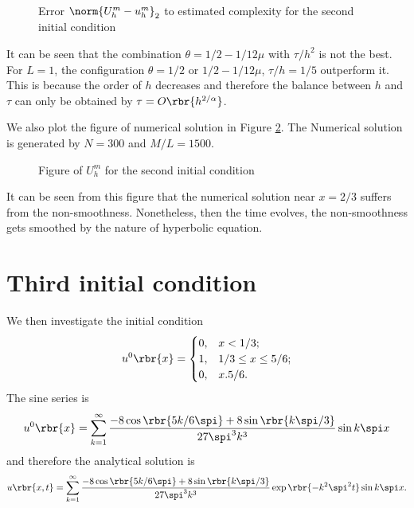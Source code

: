 \documentclass[english, nochinese]{pnote}
\begin{document}
\begin{figure}
\centering
\scalebox{0.75}{}
\caption{Error $ \norm{ U_h^m - u_h^m }_2 $ to estimated complexity for the second initial condition}
\label{Fig:Eff22}
\end{figure}

It can be seen that the combination $ \theta = 1 / 2 - 1 / 12 \mu $  with $ \tau / h^2 $ is not the best. For $ L = 1 $, the configuration $ \theta = 1 / 2 $ or $ 1 / 2 - 1 / 12 \mu $, $ \tau / h = 1 / 5$ outperform it. This is because the order of $h$ decreases and therefore the balance between $h$ and $\tau$ can only be obtained by $ \tau = O \rbr{h^{ 2 / \alpha }} $.

We also plot the figure of numerical solution in Figure \ref{Fig:NumSol2}. The Numerical solution is generated by $ N = 300 $ and $ M / L = 1500 $.

\begin{figure}
\centering

\caption{Figure of $U_h^m$ for the second initial condition}
\label{Fig:NumSol2}
\end{figure}

It can be seen from this figure that the numerical solution near $ x = 2 / 3 $ suffers from the non-smoothness. Nonetheless, then the time evolves, the non-smoothness gets smoothed by the nature of hyperbolic equation.

\section{Third initial condition}

We then investigate the initial condition
\begin{equation}
u^0 \rbr{x} =
\begin{cases}
0, & x < 1 / 3; \\
1, & 1 / 3 \le x \le 5 / 6; \\
0, & x . 5 / 6.
\end{cases}
\end{equation}
The sine series is
\begin{equation}
u^0 \rbr{x} = \sum_{ k = 1 }^{\infty} \frac{ -8 \cos \rbr{ 5 k / 6 \spi } + 8 \sin \rbr{ k \spi / 3 } }{ 27 \spi^3 k^3 } \sin k \spi x
\end{equation}
and therefore the analytical solution is
\begin{equation}
u \rbr{ x, t } = \sum_{ k = 1 }^{\infty} \frac{ -8 \cos \rbr{ 5 k / 6 \spi } + 8 \sin \rbr{ k \spi / 3 } }{ 27 \spi^3 k^3 } \exp \rbr{ -k^2 \spi^2 t } \sin k \spi x.
\end{equation}
\end{document}
